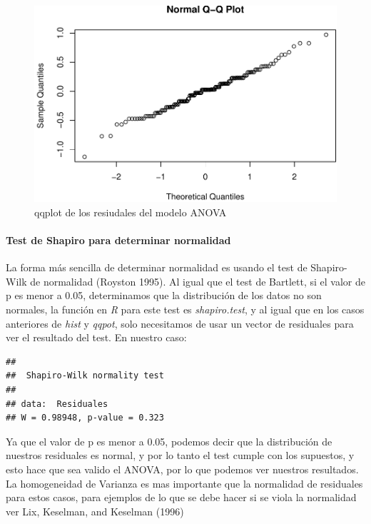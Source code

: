 \documentclass[]{article}
\newenvironment{Shaded}{\begin{snugshade}}{\end{snugshade}}
\newcommand{\KeywordTok}[1]{\textcolor[rgb]{0.13,0.29,0.53}{\textbf{#1}}}
\newcommand{\OperatorTok}[1]{\textcolor[rgb]{0.81,0.36,0.00}{\textbf{#1}}}
\newcommand{\NormalTok}[1]{#1}
\let\oldparagraph\paragraph
\renewcommand{\paragraph}[1]{\oldparagraph{#1}\mbox{}}
\begin{document}
\begin{figure}
\centering
\includegraphics{Guia3_files/figure-latex/unnamed-chunk-11-1.pdf}
\caption{qqplot de los resiudales del modelo ANOVA}
\end{figure}

\paragraph{Test de Shapiro para determinar
normalidad}\label{test-de-shapiro-para-determinar-normalidad}

La forma más sencilla de determinar normalidad es usando el test de
Shapiro-Wilk de normalidad (Royston 1995). Al igual que el test de
Bartlett, si el valor de p es menor a 0.05, determinamos que la
distribución de los datos no son normales, la función en \emph{R} para
este test es \emph{shapiro.test}, y al igual que en los casos anteriores
de \emph{hist} y \emph{qqpot}, solo necesitamos de usar un vector de
residuales para ver el resultado del test. En nuestro caso:

\begin{Shaded}
\end{Shaded}

\begin{verbatim}
## 
##  Shapiro-Wilk normality test
## 
## data:  Residuales
## W = 0.98948, p-value = 0.323
\end{verbatim}

Ya que el valor de p es menor a 0.05, podemos decir que la distribución
de nuestros residuales es normal, y por lo tanto el test cumple con los
supuestos, y esto hace que sea valido el ANOVA, por lo que podemos ver
nuestros resultados. La homogeneidad de Varianza es mas importante que
la normalidad de residuales para estos casos, para ejemplos de lo que se
debe hacer si se viola la normalidad ver Lix, Keselman, and Keselman
(1996)
\end{document}

